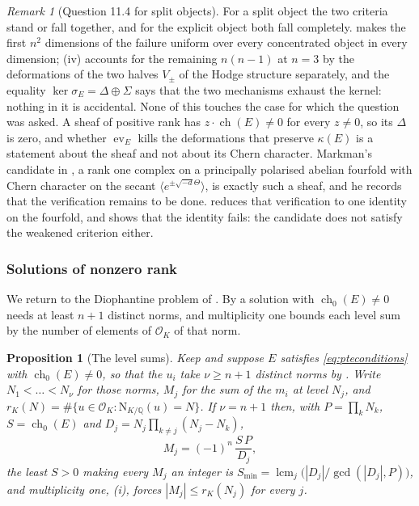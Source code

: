 \documentclass[11pt,reqno]{amsart}
\theoremstyle{plain}
\newtheorem{proposition}[theorem]{Proposition}
\theoremstyle{definition}
\theoremstyle{remark}
\newtheorem{remark}[theorem]{Remark}
\newcommand{\QQ}{\mathbb{Q}}
\newcommand{\cO}{\mathcal{O}}
\newcommand{\Nm}{\mathrm{N}}             %
\DeclareMathOperator{\ch}{ch}
\begin{document}
\begin{remark}[Question 11.4 for split objects]
\label{rem:question114}
For a split object the two criteria stand or fall together, and for the
explicit object both fall completely. \cite[Theorem~9.19]{paperI} makes the first
$n^{2}$ dimensions of the failure uniform over every concentrated object in
every dimension; (iv) accounts for the remaining
$n(n-1)$ at $n=3$ by the deformations of the two halves $V_{\pm}$ of the
Hodge structure separately, and the equality $\ker\sigma_{E}=\Delta\oplus\Sigma$
says that the two mechanisms exhaust the kernel: nothing in it is
accidental. None of this touches the case for which the question was asked.
A sheaf of positive rank has $z\cdot\ch(E)\ne0$ for every $z\ne0$, so its
$\Delta$ is zero, and whether $\operatorname{ev}_{E}$ kills the deformations
that preserve $\kappa(E)$ is a statement about the sheaf and not about its
Chern character. Markman's candidate in \cite[Section 12]{Mar25b}, a rank
one complex on a principally polarised abelian fourfold with Chern character
on the secant $\langle e^{\pm\sqrt{-d}\Theta}\rangle$, is exactly such a
sheaf, and he records that the verification remains to be done.
 reduces that verification to one identity on the fourfold,
and  shows that the identity fails: the candidate
does not satisfy the weakened criterion either.
\end{remark}

\subsubsection*{Solutions of nonzero rank}

We return to the Diophantine problem of . By
 a solution with $\ch_{0}(E)\ne0$ needs at least $n+1$
distinct norms, and multiplicity one bounds each level sum by the number of
elements of $\cO_{K}$ of that norm.

\begin{proposition}[The level sums]\label{thm:pterange}
Keep  and suppose $E$ satisfies \eqref{eq:pteconditions} with
$\ch_{0}(E)\ne0$, so that the $u_{i}$ take $\nu\ge n+1$ distinct norms by
. Write $N_{1}<\dots<N_{\nu}$ for those norms, $M_{j}$ for
the sum of the $m_{i}$ at level $N_{j}$, and
$r_{K}(N)=\#\{u\in\cO_{K}:\Nm_{K/\QQ}(u)=N\}$. If $\nu=n+1$ then, with
$P=\prod_{k}N_{k}$, $S=\ch_{0}(E)$ and
$D_{j}=N_{j}\prod_{k\ne j}(N_{j}-N_{k})$,
\begin{equation}\label{eq:levelsums}
  M_{j}=(-1)^{n}\,\frac{S\,P}{D_{j}},
\end{equation}
the least $S>0$ making every $M_{j}$ an integer is
$S_{\min}=\operatorname{lcm}_{j}\bigl(|D_{j}|/\gcd(|D_{j}|,P)\bigr)$, and
multiplicity one, (i), forces
$|M_{j}|\le r_{K}(N_{j})$ for every $j$.
\end{proposition}
\end{document}
